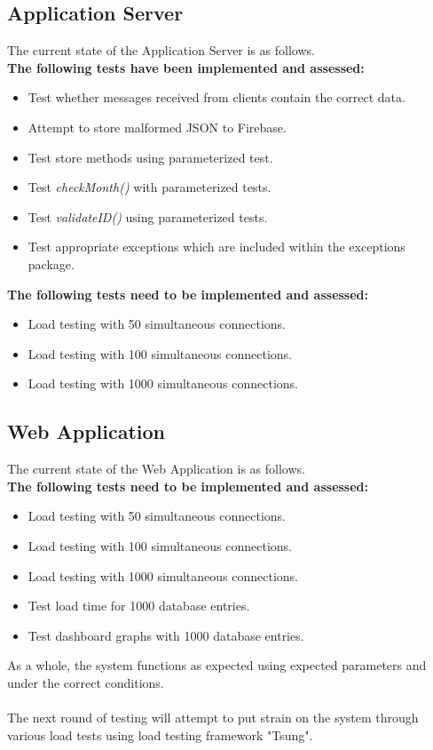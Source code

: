 \documentclass[a4paper,10pt]{article}
\begin{document}
	\subsection{Application Server}
	The current state of the Application Server is as follows.
	\textbf{\\The following tests have been implemented and assessed:}
	\begin{itemize}
		\item Test whether messages received from clients contain the correct data.
		\item Attempt to store malformed JSON to Firebase.
		\item Test store methods using parameterized test.
		\item Test \textit{checkMonth()} with parameterized tests.
		\item Test \textit{validateID()} using parameterized tests.
		\item Test appropriate exceptions which are included within the exceptions package.
	\end{itemize}
	
	\textbf{The following tests need to be implemented and assessed:}
	\begin{itemize}
		\item Load testing with 50 simultaneous connections.
		\item Load testing with 100 simultaneous connections.
		\item Load testing with 1000 simultaneous connections.
	\end{itemize}
	
	\subsection{Web Application}
	The current state of the Web Application is as follows.
	\textbf{\\The following tests need to be implemented and assessed:}
	\begin{itemize}
		\item Load testing with 50 simultaneous connections.
		\item Load testing with 100 simultaneous connections.
		\item Load testing with 1000 simultaneous connections.
		\item Test load time for 1000 database entries.
		\item Test dashboard graphs with 1000 database entries.
	\end{itemize}
	
	As a whole, the system functions as expected using expected parameters and under the correct conditions.\\\\The next round of testing will attempt to put strain on the system through various load tests using load testing framework "Tsung".
	
\end{document}
